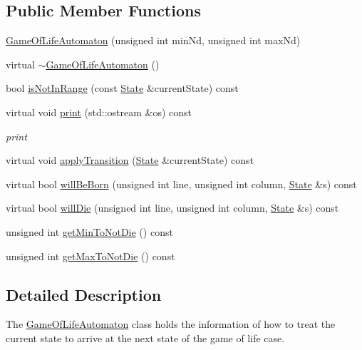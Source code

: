 \subsection*{Public Member Functions}
\begin{DoxyCompactItemize}
\item 
\mbox{\hyperlink{class_game_of_life_automaton_a9d9a437e1f57f13a5ad9cc1c3d441ddf}{Game\+Of\+Life\+Automaton}} (unsigned int min\+Nd, unsigned int max\+Nd)
\item 
virtual \mbox{\hyperlink{class_game_of_life_automaton_a3f4ab2012723f8d5eb587a569c91c6ad}{$\sim$\+Game\+Of\+Life\+Automaton}} ()
\item 
bool \mbox{\hyperlink{class_game_of_life_automaton_aa25460a77972a5f13f57bb5f5adece53}{is\+Not\+In\+Range}} (const \mbox{\hyperlink{class_state}{State}} \&current\+State) const
\item 
virtual void \mbox{\hyperlink{class_game_of_life_automaton_a090e7935a13cb6f71a0331fff7cb6083}{print}} (std\+::ostream \&os) const
\begin{DoxyCompactList}\small\item\em print \end{DoxyCompactList}\item 
virtual void \mbox{\hyperlink{class_game_of_life_automaton_ac806423a9e936950e2dabd6989575f1e}{apply\+Transition}} (\mbox{\hyperlink{class_state}{State}} \&current\+State) const
\item 
virtual bool \mbox{\hyperlink{class_game_of_life_automaton_a48d5d90ed7e6e62f796700a73671d5e7}{will\+Be\+Born}} (unsigned int line, unsigned int column, \mbox{\hyperlink{class_state}{State}} \&s) const
\item 
virtual bool \mbox{\hyperlink{class_game_of_life_automaton_a10c2c84bfceec5d67149d9b51849c181}{will\+Die}} (unsigned int line, unsigned int column, \mbox{\hyperlink{class_state}{State}} \&s) const
\item 
unsigned int \mbox{\hyperlink{class_game_of_life_automaton_a5b39939cf80b47d3b0c5a0c16dc07c2e}{get\+Min\+To\+Not\+Die}} () const
\item 
unsigned int \mbox{\hyperlink{class_game_of_life_automaton_afe6b71a259b440f172ca8428af92f9ec}{get\+Max\+To\+Not\+Die}} () const
\end{DoxyCompactItemize}


\subsection{Detailed Description}
The \mbox{\hyperlink{class_game_of_life_automaton}{Game\+Of\+Life\+Automaton}} class holds the information of how to treat the current state to arrive at the next state of the game of life case. 

